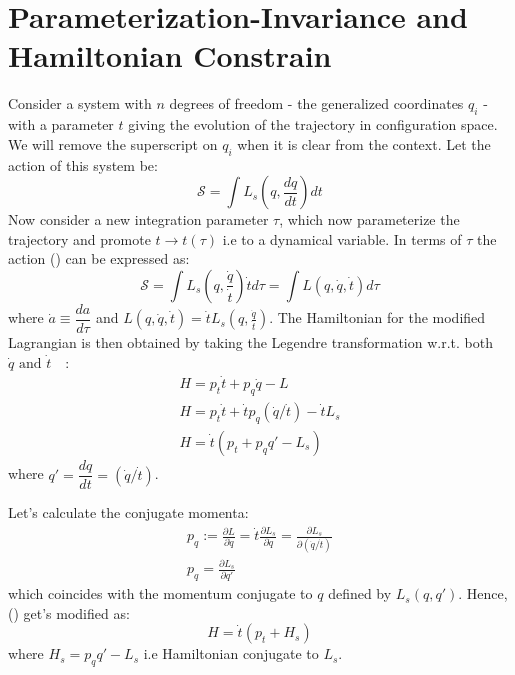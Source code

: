 \section*{Parameterization-Invariance and Hamiltonian Constrain}
Consider a system with $n$ degrees of freedom - the generalized coordinates $q_i$ - with a parameter $t$ giving the evolution of the trajectory in configuration space. We will remove the superscript
on $q_i$ when it is clear from the context. Let the action of this system be:
\begin{equation}
	\label{eq:action_t}
	\mathcal{S} = \int L_s\left(q, \frac{dq}{dt}\right)  dt
\end{equation}
Now consider a new integration parameter \(\tau\), which now parameterize the trajectory and promote \(t \to t(\tau)\) i.e to  a dynamical variable.
In terms of \(\tau\) the action () can be expressed as:
\begin{equation}
	\mathcal{S} = \int L_s\left(q, \frac{\Dot{q}}{\Dot{t}}\right)  \Dot{t} d\tau =  \int L\left(q, \Dot{q}, \Dot{t}\right)   d\tau
\end{equation}
where \(\dot{a} \equiv \dfrac{d a}{d \tau}\) and 
\(L\left(q, \Dot{q}, \Dot{t}\right) = \Dot{t}L_s\left(q, \frac{\Dot{q}}{\Dot{t}}\right)  \).
The Hamiltonian for the modified Lagrangian is then obtained by taking the Legendre
transformation w.r.t. both \(\dot{q} \text{ and } \dot{t}\)\ ~\cite{deriglazov2011reparametrization}:
\begin{equation}
	\label{eq:hamlt_L}
	\begin{gathered}
		H =  p_t \dot{t} + p_q \dot{q} - L\\
		H =  p_t \dot{t} + \dot{t} p_q (\dot{q}/\dot{t}) - \dot{t}L_s\\
		H  = \dot{t} \left(p_t + p_q q'- L_s\right)
	\end{gathered}
\end{equation}
where \(q'=\dfrac{dq}{dt}=(\dot{q}/\dot{t})\).

Let's calculate the conjugate momenta:
\begin{equation}
	\begin{gathered}
		p_q := \frac{\partial L}{\partial\dot{q}}
		= \dot{t}\frac{\partial L_s}{\partial\dot{q}}
		=\frac{\partial L_s}{\partial(\dot{q}/ \dot{t})}\\
		p_q = \frac{\partial L_s}{\partial q'}
	\end{gathered}
\end{equation}
which coincides with the momentum conjugate to $q$ defined by $L_s(q, q′)$. Hence, () get's modified as:
\begin{equation}
	\label{eq:hamil_contrain_Hs}
	H  = \dot{t} \left(p_t + H_s\right)
\end{equation}
where \(H_s = p_q q'- L_s\) i.e Hamiltonian conjugate to \(L_s\).

